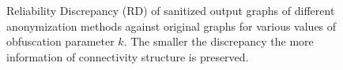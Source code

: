 \begin{figure}[t]
    \centering
    \vspace{-5pt}
    \caption{Reliability Discrepancy (RD) of sanitized output graphs of different anonymization methods against original graphs for various values of obfuscation parameter $k$. The smaller the discrepancy the more information of connectivity structure is preserved.}
    \label{fig:rd}
\end{figure} 
